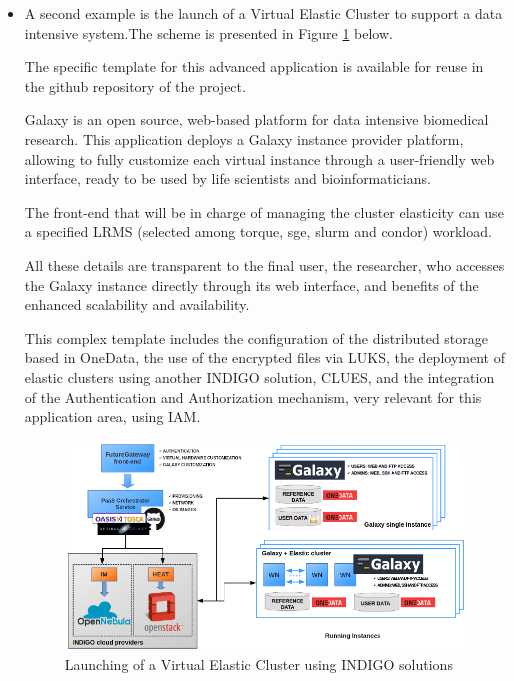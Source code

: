 \documentclass{article}
\begin{document}
{\begin{itemize}
\item A second example is the launch of a Virtual Elastic Cluster to support a data intensive system.The scheme is presented in Figure \ref{fig:14} below. 

The specific template for this advanced application is available for reuse in the github repository of the project.

Galaxy is an open source, web-based platform for data intensive biomedical research. This application deploys a Galaxy instance provider platform, allowing to fully customize each virtual instance through a user-friendly web interface, ready to be used by life scientists and bioinformaticians.

The front-end that will be in charge of managing the cluster elasticity can use a specified LRMS (selected among torque, sge, slurm and condor) workload.

All these details are transparent to the final user, the researcher, who accesses the Galaxy instance directly through its web interface, and benefits of the enhanced scalability and availability.

This complex template includes the configuration of the distributed storage based in OneData, the use of the encrypted files via LUKS, the deployment of elastic clusters using another INDIGO solution, CLUES, and the integration of the Authentication and Authorization mechanism, very relevant for this application area, using IAM.  

\begin{figure}
  \centering
  \includegraphics[width=\textwidth]{./figs/Figure14.pdf}
  \caption{Launching of a Virtual Elastic Cluster using INDIGO solutions}
  \label{fig:14}
\end{figure}



\end{itemize}





}
\end{document}

